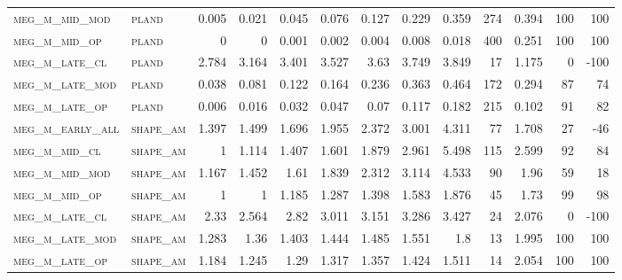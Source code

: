 \begin{landscape}
\begin{center}
\begin{footnotesize}
\begin{longtable}{llrrrrrrrr|rrr}
\textsc{meg\_m\_mid\_mod  } & \textsc{pland     }   & 0.005    & 0.021    & 0.045    & 0.076    & 0.127    & 0.229    & 0.359     & 274    & 0.394         & 100           & 100             \\
\textsc{meg\_m\_mid\_op   } & \textsc{pland     }   & 0        & 0        & 0.001    & 0.002    & 0.004    & 0.008    & 0.018     & 400    & 0.251         & 100           & 100             \\
\textsc{meg\_m\_late\_cl  } & \textsc{pland     }   & 2.784    & 3.164    & 3.401    & 3.527    & 3.63     & 3.749    & 3.849     & 17     & 1.175         & 0             & -100            \\
\textsc{meg\_m\_late\_mod } & \textsc{pland     }   & 0.038    & 0.081    & 0.122    & 0.164    & 0.236    & 0.363    & 0.464     & 172    & 0.294         & 87            & 74              \\
\textsc{meg\_m\_late\_op  } & \textsc{pland     }   & 0.006    & 0.016    & 0.032    & 0.047    & 0.07     & 0.117    & 0.182     & 215    & 0.102         & 91            & 82              \\
\textsc{meg\_m\_early\_all} & \textsc{shape\_am }   & 1.397    & 1.499    & 1.696    & 1.955    & 2.372    & 3.001    & 4.311     & 77     & 1.708         & 27            & -46             \\
\textsc{meg\_m\_mid\_cl   } & \textsc{shape\_am }   & 1        & 1.114    & 1.407    & 1.601    & 1.879    & 2.961    & 5.498     & 115    & 2.599         & 92            & 84              \\
\textsc{meg\_m\_mid\_mod  } & \textsc{shape\_am }   & 1.167    & 1.452    & 1.61     & 1.839    & 2.312    & 3.114    & 4.533     & 90     & 1.96          & 59            & 18              \\
\textsc{meg\_m\_mid\_op   } & \textsc{shape\_am }   & 1        & 1        & 1.185    & 1.287    & 1.398    & 1.583    & 1.876     & 45     & 1.73          & 99            & 98              \\
\textsc{meg\_m\_late\_cl  } & \textsc{shape\_am }   & 2.33     & 2.564    & 2.82     & 3.011    & 3.151    & 3.286    & 3.427     & 24     & 2.076         & 0             & -100            \\
\textsc{meg\_m\_late\_mod } & \textsc{shape\_am }   & 1.283    & 1.36     & 1.403    & 1.444    & 1.485    & 1.551    & 1.8       & 13     & 1.995         & 100           & 100             \\
\textsc{meg\_m\_late\_op  } & \textsc{shape\_am }   & 1.184    & 1.245    & 1.29     & 1.317    & 1.357    & 1.424    & 1.511     & 14     & 2.054         & 100           & 100             \\

\end{longtable}
\end{footnotesize}
\end{center}
\end{landscape}
